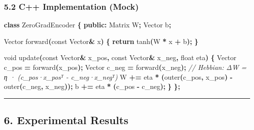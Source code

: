 \documentclass[
  11pt,
  a4paper,
]{article}
\newenvironment{Shaded}{\begin{snugshade}}{\end{snugshade}}
\newcommand{\AttributeTok}[1]{\textcolor[rgb]{0.13,0.29,0.53}{#1}}
\newcommand{\CommentTok}[1]{\textcolor[rgb]{0.56,0.35,0.01}{\textit{#1}}}
\newcommand{\ControlFlowTok}[1]{\textcolor[rgb]{0.13,0.29,0.53}{\textbf{#1}}}
\newcommand{\DataTypeTok}[1]{\textcolor[rgb]{0.13,0.29,0.53}{#1}}
\newcommand{\KeywordTok}[1]{\textcolor[rgb]{0.13,0.29,0.53}{\textbf{#1}}}
\newcommand{\NormalTok}[1]{#1}
\newcommand{\OperatorTok}[1]{\textcolor[rgb]{0.81,0.36,0.00}{\textbf{#1}}}
\begin{document}
\subsubsection{5.2 C++ Implementation
(Mock)}\label{c-implementation-mock}

\begin{Shaded}
\begin{Highlighting}[]
\KeywordTok{class}\NormalTok{ ZeroGradEncoder }\OperatorTok{\{}
\KeywordTok{public}\OperatorTok{:}
\NormalTok{    Matrix W}\OperatorTok{;}
\NormalTok{    Vector b}\OperatorTok{;}
    
\NormalTok{    Vector forward}\OperatorTok{(}\AttributeTok{const}\NormalTok{ Vector}\OperatorTok{\&}\NormalTok{ x}\OperatorTok{)} \OperatorTok{\{}
        \ControlFlowTok{return}\NormalTok{ tanh}\OperatorTok{(}\NormalTok{W }\OperatorTok{*}\NormalTok{ x }\OperatorTok{+}\NormalTok{ b}\OperatorTok{);}
    \OperatorTok{\}}
    
    \DataTypeTok{void}\NormalTok{ update}\OperatorTok{(}\AttributeTok{const}\NormalTok{ Vector}\OperatorTok{\&}\NormalTok{ x\_pos}\OperatorTok{,} \AttributeTok{const}\NormalTok{ Vector}\OperatorTok{\&}\NormalTok{ x\_neg}\OperatorTok{,} \DataTypeTok{float}\NormalTok{ eta}\OperatorTok{)} \OperatorTok{\{}
\NormalTok{        Vector c\_pos }\OperatorTok{=}\NormalTok{ forward}\OperatorTok{(}\NormalTok{x\_pos}\OperatorTok{);}
\NormalTok{        Vector c\_neg }\OperatorTok{=}\NormalTok{ forward}\OperatorTok{(}\NormalTok{x\_neg}\OperatorTok{);}
        \CommentTok{// Hebbian: ΔW = η · (c\_pos·x\_posᵀ {-} c\_neg·x\_negᵀ)}
\NormalTok{        W }\OperatorTok{+=}\NormalTok{ eta }\OperatorTok{*} \OperatorTok{(}\NormalTok{outer}\OperatorTok{(}\NormalTok{c\_pos}\OperatorTok{,}\NormalTok{ x\_pos}\OperatorTok{)} \OperatorTok{{-}}\NormalTok{ outer}\OperatorTok{(}\NormalTok{c\_neg}\OperatorTok{,}\NormalTok{ x\_neg}\OperatorTok{));}
\NormalTok{        b }\OperatorTok{+=}\NormalTok{ eta }\OperatorTok{*} \OperatorTok{(}\NormalTok{c\_pos }\OperatorTok{{-}}\NormalTok{ c\_neg}\OperatorTok{);}
    \OperatorTok{\}}
\OperatorTok{\};}
\end{Highlighting}
\end{Shaded}

\begin{center}\rule{0.5\linewidth}{0.5pt}\end{center}

\subsection{6. Experimental Results}\label{experimental-results}
\end{document}
